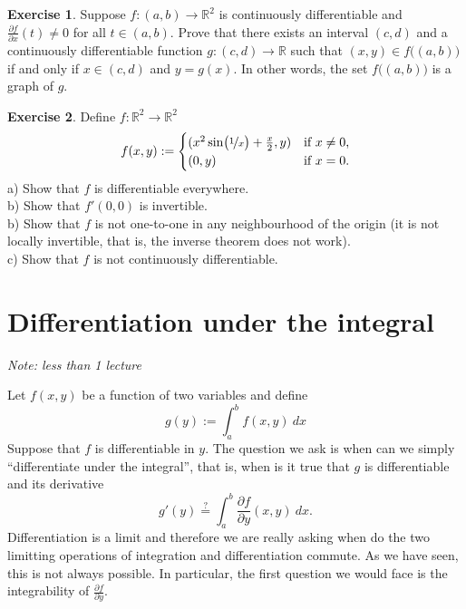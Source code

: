 \documentclass[12pt]{book}
\newcommand{\R}{{\mathbb{R}}}
\newcommand{\sectionnotes}[1]{\noindent \emph{Note: #1} \medskip \par}
\newcommand{\sectionnewpage}{\clearpage}
\theoremstyle{plain}
\theoremstyle{remark}
\theoremstyle{definition}
\theoremstyle{exercise}
\newtheorem{exercise}{Exercise}[section]
\theoremstyle{example}
\begin{document}
\begin{exercise}
Suppose $f \colon (a,b) \to \R^2$ is continuously differentiable and
$\frac{\partial f}{\partial x}(t) \not= 0$ for all $t \in (a,b)$.
Prove that there exists an interval $(c,d)$ and
a continuously differentiable function $g \colon (c,d) \to \R$
such that 
$(x,y) \in f\bigl((a,b)\bigr)$ if and only if $x \in (c,d)$ and $y=g(x)$.
In other words, the set
$f\bigl((a,b)\bigr)$ is a graph of $g$.
\end{exercise}

\begin{exercise}
Define $f \colon \R^2 \to \R^2$
\begin{equation*}
f(x,y) :=
\begin{cases}
(x^2 \sin \bigl(\nicefrac{1}{x}\bigr) + \frac{x}{2} , y ) & \text{if $x \not= 0$,} \\
(0,y) & \text{if $x=0$.}
\end{cases}
\end{equation*}
a) Show that $f$ is differentiable everywhere.\\
b) Show that $f'(0,0)$ is invertible.\\
b) Show that $f$ is not one-to-one in any neighbourhood of the origin (it is
not locally invertible, that is, the inverse theorem does not work).\\
c) Show that $f$ is not continuously differentiable.
\end{exercise}




\sectionnewpage
\section{Differentiation under the integral}
\label{sec:diffunderint}

\sectionnotes{less than 1 lecture}

Let $f(x,y)$ be a function of two variables and define
\begin{equation*}
g(y) := \int_a^b f(x,y) ~dx
\end{equation*}
Suppose that $f$ is differentiable in $y$.  The question we ask is
when can we simply ``differentiate under the integral'', that is,
when is it true that $g$ is differentiable and its derivative
\begin{equation*}
g'(y) \overset{?}{=} \int_a^b \frac{\partial f}{\partial y}(x,y) ~dx .
\end{equation*}
Differentiation is a limit and therefore we are really asking when do the
two limitting operations of integration and differentiation commute.
As we have seen, this is not always possible.  In particular, the first
question we would face is the integrability of
$\frac{\partial f}{\partial y}$.
\end{document}
